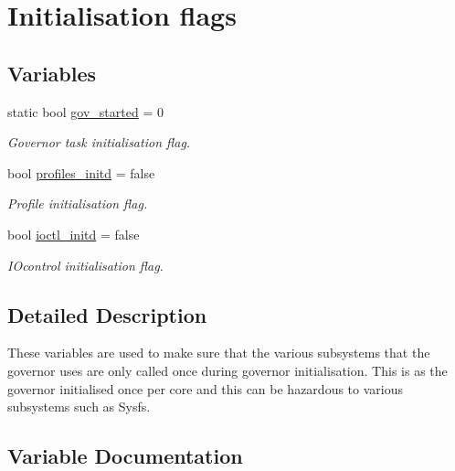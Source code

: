 \hypertarget{group__initialisation__flags}{}\section{Initialisation flags}
\label{group__initialisation__flags}
\subsection*{Variables}
\begin{DoxyCompactItemize}
\item 
static bool \hyperlink{group__initialisation__flags_ga108454816c9d72eb1b7865c6b8055a4f}{gov\+\_\+started} = 0
\begin{DoxyCompactList}\small\item\em Governor task initialisation flag. \end{DoxyCompactList}\item 
bool \hyperlink{group__initialisation__flags_gac119eb310007378a0e5dc060602ce66c}{profiles\+\_\+initd} = false
\begin{DoxyCompactList}\small\item\em Profile initialisation flag. \end{DoxyCompactList}\item 
bool \hyperlink{group__initialisation__flags_gabda9d595ebe2d5ff3270e7ee4a731846}{ioctl\+\_\+initd} = false
\begin{DoxyCompactList}\small\item\em I\+Ocontrol initialisation flag. \end{DoxyCompactList}\end{DoxyCompactItemize}


\subsection{Detailed Description}
These variables are used to make sure that the various subsystems that the governor uses are only called once during governor initialisation. This is as the governor initialised once per core and this can be hazardous to various subsystems such as Sysfs. 

\subsection{Variable Documentation}
\mbox{\label{group__initialisation__flags_ga108454816c9d72eb1b7865c6b8055a4f}} 
